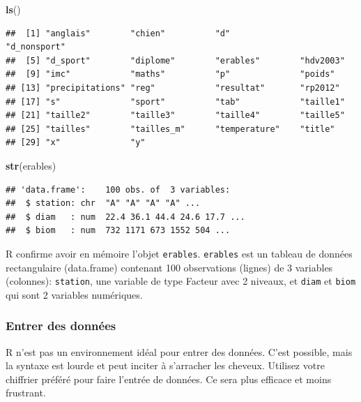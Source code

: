 \documentclass[12pt,]{book}
\newenvironment{Shaded}{\begin{snugshade}}{\end{snugshade}}
\newcommand{\KeywordTok}[1]{\textcolor[rgb]{0.27,0.27,0.27}{\textbf{#1}}}
\newcommand{\NormalTok}[1]{#1}
\begin{document}
\begin{Shaded}
\begin{Highlighting}[]
\KeywordTok{ls}\NormalTok{()}
\end{Highlighting}
\end{Shaded}

\begin{verbatim}
##  [1] "anglais"        "chien"          "d"              "d_nonsport"    
##  [5] "d_sport"        "diplome"        "erables"        "hdv2003"       
##  [9] "imc"            "maths"          "p"              "poids"         
## [13] "precipitations" "reg"            "resultat"       "rp2012"        
## [17] "s"              "sport"          "tab"            "taille1"       
## [21] "taille2"        "taille3"        "taille4"        "taille5"       
## [25] "tailles"        "tailles_m"      "temperature"    "title"         
## [29] "x"              "y"
\end{verbatim}

\begin{Shaded}
\begin{Highlighting}[]
\KeywordTok{str}\NormalTok{(erables)}
\end{Highlighting}
\end{Shaded}

\begin{verbatim}
## 'data.frame':	100 obs. of  3 variables:
##  $ station: chr  "A" "A" "A" "A" ...
##  $ diam   : num  22.4 36.1 44.4 24.6 17.7 ...
##  $ biom   : num  732 1171 673 1552 504 ...
\end{verbatim}

R confirme avoir en mémoire l'objet \texttt{erables}.
\texttt{erables} est un tableau de données rectangulaire (data.frame) contenant 100 observations (lignes) de 3 variables (colonnes): \texttt{station}, une variable de type Facteur avec 2 niveaux, et \texttt{diam} et \texttt{biom} qui sont 2 variables numériques.

\hypertarget{entrer-des-donnuxe9es}{%
\subsubsection{Entrer des données}\label{entrer-des-donnuxe9es}}

R n'est pas un environnement idéal pour entrer des données.
C'est possible, mais la syntaxe est lourde et peut inciter à s'arracher les cheveux.
Utilisez votre chiffrier préféré pour faire l'entrée de données.
Ce sera plus efficace et moins frustrant.
\end{document}
